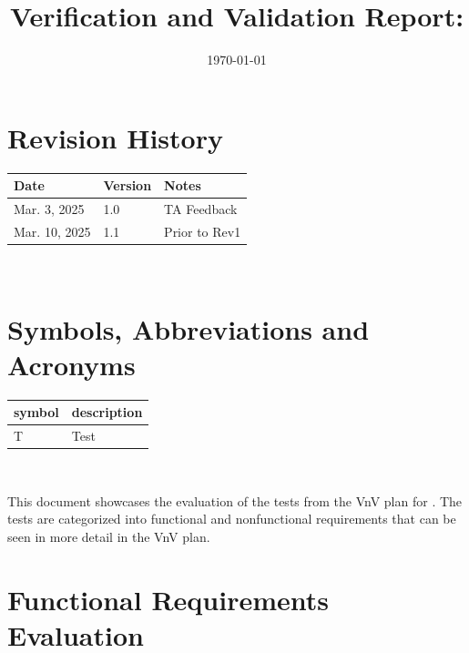 \documentclass[12pt, titlepage]{article}
\begin{document}
\title{Verification and Validation Report: \progname} 
\author{\authname}
\date{\today}
	
\maketitle


\section{Revision History}

\begin{tabularx}{\textwidth}{p{3cm}p{2cm}X}
\toprule {\bf Date} & {\bf Version} & {\bf Notes}\\
\midrule
Mar. 3, 2025 & 1.0 & TA Feedback\\
Mar. 10, 2025 & 1.1 & Prior to Rev1\\
\bottomrule
\end{tabularx}

~\newpage

\section{Symbols, Abbreviations and Acronyms}

\renewcommand{\arraystretch}{1.2}
\begin{tabular}{l l} 
  \toprule		
  \textbf{symbol} & \textbf{description}\\
  \midrule 
  T & Test\\
  \bottomrule
\end{tabular}\\


\newpage

\tableofcontents

\listoftables %

\listoffigures %

\newpage


This document showcases the evaluation of the tests from the VnV plan for \progname.
The tests are categorized into functional and nonfunctional requirements that can be
seen in more detail in the VnV plan.

\section{Functional Requirements Evaluation}
\end{document}
